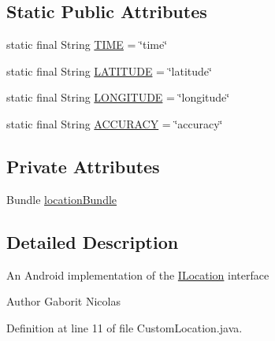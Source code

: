 \subsection*{Static Public Attributes}
\begin{DoxyCompactItemize}
\item 
static final String \hyperlink{classcom_1_1qualoutdoor_1_1recorder_1_1location_1_1CustomLocation_a4fef2ee705e7d09bc57f473d44907c74}{T\-I\-M\-E} = \char`\"{}time\char`\"{}
\item 
static final String \hyperlink{classcom_1_1qualoutdoor_1_1recorder_1_1location_1_1CustomLocation_a96a2dd85b090a1a1ec5958b707a5bf73}{L\-A\-T\-I\-T\-U\-D\-E} = \char`\"{}latitude\char`\"{}
\item 
static final String \hyperlink{classcom_1_1qualoutdoor_1_1recorder_1_1location_1_1CustomLocation_aa0d072cccd2d0a4e23d3de0eff553d42}{L\-O\-N\-G\-I\-T\-U\-D\-E} = \char`\"{}longitude\char`\"{}
\item 
static final String \hyperlink{classcom_1_1qualoutdoor_1_1recorder_1_1location_1_1CustomLocation_a291960c31ad50b5224edbeb9a97b6a27}{A\-C\-C\-U\-R\-A\-C\-Y} = \char`\"{}accuracy\char`\"{}
\end{DoxyCompactItemize}
\subsection*{Private Attributes}
\begin{DoxyCompactItemize}
\item 
Bundle \hyperlink{classcom_1_1qualoutdoor_1_1recorder_1_1location_1_1CustomLocation_ae6164f889b9fed37331fcbc5df2420f2}{location\-Bundle}
\end{DoxyCompactItemize}


\subsection{Detailed Description}
An Android implementation of the \hyperlink{interfacecom_1_1qualoutdoor_1_1recorder_1_1location_1_1ILocation}{I\-Location} interface

\begin{DoxyAuthor}{Author}
Gaborit Nicolas 
\end{DoxyAuthor}


Definition at line 11 of file Custom\-Location.\-java.



